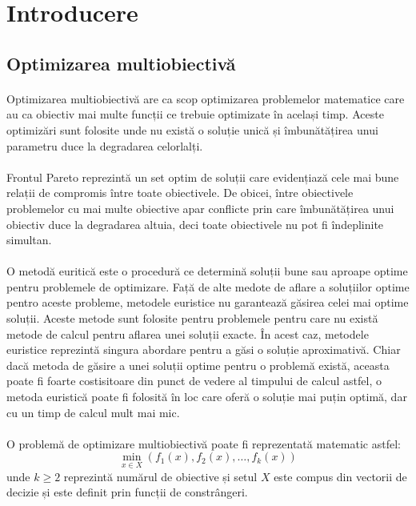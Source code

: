 \documentclass[12pt]{article}
\begin{document}
\section{Introducere}
\subsection{Optimizarea multiobiectivă}
\paragraph{}
Optimizarea multiobiectivă are ca scop optimizarea problemelor matematice care au ca obiectiv mai multe funcții ce trebuie optimizate în același timp. Aceste optimizări sunt folosite unde nu există o soluție unică și îmbunătățirea unui parametru duce la degradarea celorlalți.
\paragraph{}
Frontul Pareto reprezintă un set optim de soluții care evidențiază cele mai bune relații de compromis între toate obiectivele. De obicei, între obiectivele problemelor cu mai multe obiective apar conflicte prin care îmbunătățirea unui obiectiv duce la degradarea altuia, deci toate obiectivele nu pot fi îndeplinite simultan. \cite{pareto}
\paragraph{}
O metodă euritică este o procedură ce determină soluții bune sau aproape optime pentru problemele de optimizare. Față de alte medote de aflare a soluțiilor optime pentro aceste probleme, metodele euristice nu garantează găsirea celei mai optime soluții. Aceste metode sunt folosite pentru problemele pentru care nu există metode de calcul pentru aflarea unei soluții exacte. În acest caz, metodele euristice reprezintă singura abordare pentru a găsi o soluție aproximativă. Chiar dacă metoda de găsire a unei soluții optime pentru o problemă există, aceasta poate fi foarte costisitoare din punct de vedere al timpului de calcul astfel, o metoda euristică poate fi folosită în loc care oferă o soluție mai puțin optimă, dar cu un timp de calcul mult mai mic. \cite{euritic}
\paragraph{}
O problemă de optimizare multiobiectivă poate fi reprezentată matematic astfel:
\begin{equation}
    \displaystyle \min_{x\in X} (f_1(x),f_2(x),\dots ,f_k(x))
\end{equation}
unde $k \geq 2$ reprezintă numărul de obiective și setul $X$ este compus din vectorii de decizie și este definit prin funcții de constrângeri.
\end{document}
